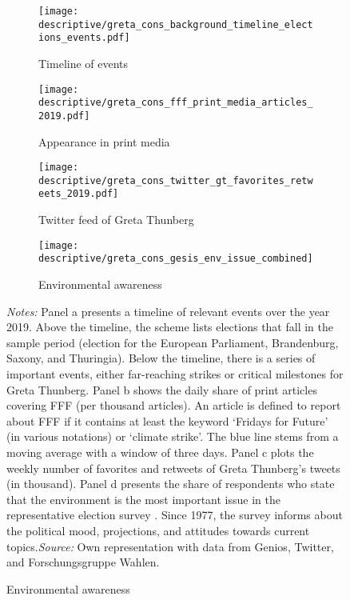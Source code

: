 \begin{landscape}
	\vspace*{\fill}
	\begin{figure}[H]\centering\caption{Important events surrounding FFF, perception in (social) media, and environmental awareness in 2019}\label{fig_greta_cons:timeline_media_awareness}
		\begin{subfigure}[h]{0.99\linewidth}\centering\caption{Timeline of events}
			\texttt{[image: descriptive/greta\_cons\_background\_timeline\_elections\_events.pdf]}
		\end{subfigure}
		
		\par\bigskip\smallskip %
		\begin{subfigure}[h]{0.33\linewidth}\centering\caption{Appearance in print media}
			\texttt{[image: descriptive/greta\_cons\_fff\_print\_media\_articles\_2019.pdf]}
		\end{subfigure}
		\begin{subfigure}[h]{0.33\linewidth}\centering\caption{Twitter feed of Greta Thunberg}
			\texttt{[image: descriptive/greta\_cons\_twitter\_gt\_favorites\_retweets\_2019.pdf]}
		\end{subfigure}
		\begin{subfigure}[h]{0.33\linewidth}\centering\caption{Environmental awareness}
			\texttt{[image: descriptive/greta\_cons\_gesis\_env\_issue\_combined]}
		\end{subfigure}

		\begin{minipage}{\linewidth}
			\scriptsize{\emph{Notes:} Panel a presents a timeline of relevant events over the year 2019. Above the timeline, the scheme lists elections that fall in the sample period (election for the European Parliament, Brandenburg, Saxony, and Thuringia). Below the timeline, there is a series of important events, either far-reaching strikes or critical milestones for Greta Thunberg. Panel b shows the daily share of print articles covering FFF (per thousand articles). An article is defined to report about FFF if it contains at least the keyword `Fridays for Future' (in various notations) or `climate strike'. The blue line stems from a moving average with a window of three days. Panel c plots the weekly number of favorites and retweets of Greta Thunberg's tweets (in thousand). Panel d presents the share of respondents who state that the environment is the most important issue in the representative election survey \cite{politbarometer2019}. Since 1977, the survey informs about the political mood, projections, and attitudes towards current topics.\newline \emph{Source:} Own representation with data from Genios, Twitter, and Forschungsgruppe Wahlen.}
		\end{minipage}
	\end{figure}
	\vspace*{\fill}\clearpage
\end{landscape}
\restoregeometry